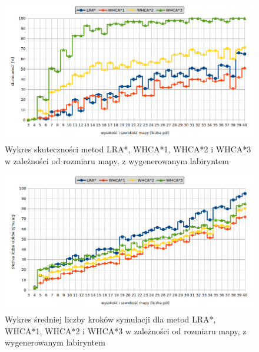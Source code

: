 
\begin{figure}
	\centering
	\includegraphics[width=0.8\columnwidth]{img/plots/test-steps-maze-mapsize-eff}
	\caption{Wykres skuteczności metod LRA*, WHCA*1, WHCA*2 i WHCA*3 w zależności od rozmiaru mapy, z wygenerowanym labiryntem}
	\label{fig:test-steps-maze-mapsize-eff}
\end{figure}
\begin{figure}
	\centering
	\includegraphics[width=0.8\columnwidth]{img/plots/test-steps-maze-mapsize-steps}
	\caption{Wykres średniej liczby kroków symulacji dla metod LRA*, WHCA*1, WHCA*2 i WHCA*3 w zależności od rozmiaru mapy, z wygenerowanym labiryntem}
	\label{fig:test-steps-maze-mapsize-steps}
\end{figure}
